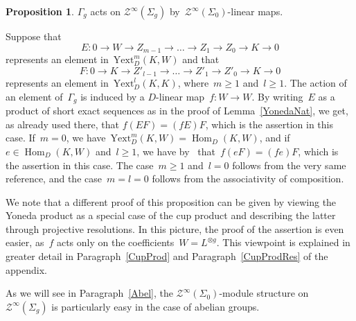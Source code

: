 \documentclass[12pt]{article}
\makeatletter
\theoremstyle{definition}
\newtheorem{Proposition}[Satz]{Proposition}
\theoremstyle{break}
\renewenvironment{proof}[1][\proofname]{\par
\vspace{-5pt}%
\pushQED{\qed}%
\normalfont
\topsep0pt \partopsep0pt %
\trivlist
\item[\hskip\labelsep
\bfseries
#1\@addpunct{.}]\ignorespaces
}{%
\popQED\endtrivlist\@endpefalse
\addvspace{6pt plus 6pt} %
}
\DeclareMathOperator\Hom{Hom}
\newcommand{\Yext}{\mathrm{Yext}}
\renewcommand{\1}{\mathbbm{1}}
\newcommand{\TFT}{\mathcal{Z}}
\newcommand{\ot}{\mathbin{\otimes}}
\makeatother
\begin{document}
\begin{Proposition} \label{MapClassYon}
$\Gamma_{g}$ acts on $\TFT^\infty(\Sigma_g)$ by~$\TFT^\infty(\Sigma_0)$-linear maps.
\end{Proposition}
\begin{proof}
Suppose that
\[E \colon 0 \to W \to Z_{m-1} \to \dots \to Z_1 \to Z_0 \to K \to 0\]
represents an element in~$\Yext_D^m(K,W)$ and that
\[F \colon 0 \to K \to Z'_{l-1} \to \dots \to Z'_1 \to Z'_0 \to K \to 0\]
represents an element in~$\Yext_D^l(K,K)$, where~$m \ge 1$ and~$l \ge 1$. The action of an element of~$\Gamma_{g}$ is induced by a $D$-linear map~$f \colon W \to W$. By writing~$E$ as a product of short exact sequences as in the proof of Lemma~\ref{YonedaNat}, we get, as already used there, that $f(EF) = (fE)F$, which is the assertion in this case. If~$m=0$, we
have~$\Yext_D^m(K,W) = \Hom_D(K,W)$, and if~$e \in \Hom_D(K,W)$ and~$l \ge 1$, we have by~\cite[Chap.~VII, \S~3, Eq.~(2), p.~171]{Mi} that~$f(eF) = (fe)F$, which is the assertion in this case. The case~$m \ge 1$ and~$l = 0$ follows from the very same reference, and the case~$m=l=0$ follows from the associativity of composition.

We note that a different proof of this proposition can be given by viewing the Yoneda product as a special case of the cup product and describing the latter through projective resolutions. In this picture, the proof of the assertion is even easier, as~$f$ acts only on the coefficients~$W = L^{\ot g}$. This viewpoint is explained in greater detail in Paragraph~\ref{CupProd} and Paragraph~\ref{CupProdRes} of the appendix.
\end{proof}

As we will see in Paragraph~\ref{Abel}, the $\TFT^\infty(\Sigma_0)$-module structure on~$\TFT^\infty(\Sigma_g)$ is particularly easy in the case of abelian groups.
\end{document}

